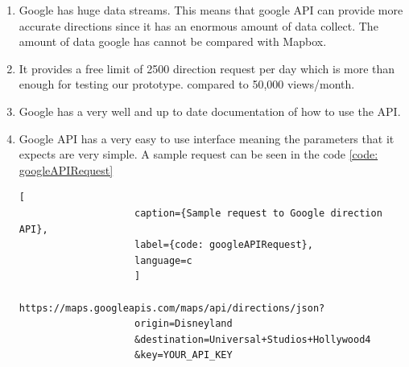         \begin{enumerate}  
            \item 
                Google has huge data streams. This means that google API can provide more
                accurate directions since it has an enormous amount of data collect. The amount
                of data google has cannot be compared with Mapbox.
            \item
                It provides a free limit of 2500 direction request per day which is more than enough for testing our prototype.
                compared to  50,000 views/month.
            \item
                Google has a very well and up to date documentation of how to use the API.  
            \item
                Google API has a very easy to use interface meaning the parameters that it expects are very simple. A sample request can be seen in the code \ref{code: googleAPIRequest}
                \begin{lstlisting}[
                    caption={Sample request to Google direction API}, 
                    label={code: googleAPIRequest},
                    language=c
                    ]
                    https://maps.googleapis.com/maps/api/directions/json?
                    origin=Disneyland
                    &destination=Universal+Studios+Hollywood4
                    &key=YOUR_API_KEY
                \end{lstlisting}    
        \end{enumerate}



